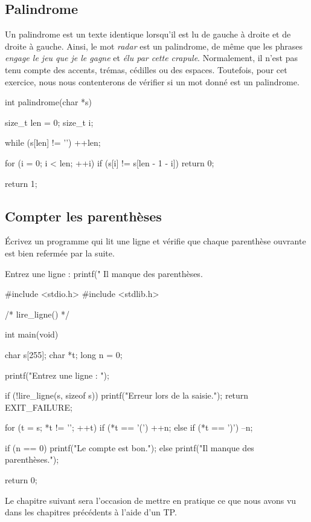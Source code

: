 \subsection{Palindrome}
\label{palindrome}

Un palindrome est un texte identique lorsqu'il est lu de gauche à droite
et de droite à gauche. Ainsi, le mot \emph{radar} est un palindrome, de
même que les phrases \emph{engage le jeu que je le gagne} et \emph{élu
par cette crapule}. Normalement, il n'est pas tenu compte des accents,
trémas, cédilles ou des espaces. Toutefois, pour cet exercice, nous nous
contenterons de vérifier si un mot donné est un palindrome.

\begin{C}
int palindrome(char *s)
{
    size_t len = 0;
    size_t i;

    while (s[len] != '\0')
        ++len;

    for (i = 0; i < len; ++i)
        if (s[i] != s[len - 1 - i])
            return 0;

    return 1;
}
\end{C}

\subsection{Compter les parenthèses}
\label{compter-les-parentheses}

Écrivez un programme qui lit une ligne et vérifie que chaque parenthèse
ouvrante est bien refermée par la suite.

\begin{C}
Entrez une ligne : printf("%
Il manque des parenthèses.
\end{C}

\begin{C}
#include <stdio.h>
#include <stdlib.h>

/* lire_ligne() */


int main(void)
{
    char s[255];
    char *t;
    long n = 0;

    printf("Entrez une ligne : ");

    if (!lire_ligne(s, sizeof s))
    {
        printf("Erreur lors de la saisie.\n");
        return EXIT_FAILURE;
    }

    for (t = s; *t != '\0'; ++t)
        if (*t == '(')
            ++n;
        else if (*t == ')')
            --n;

    if (n == 0)
        printf("Le compte est bon.\n");
    else
        printf("Il manque des parenthèses.\n");

    return 0;
}
\end{C}

\hrulefill

Le chapitre suivant sera l'occasion de mettre en pratique ce que nous
avons vu dans les chapitres précédents à l'aide d'un TP.